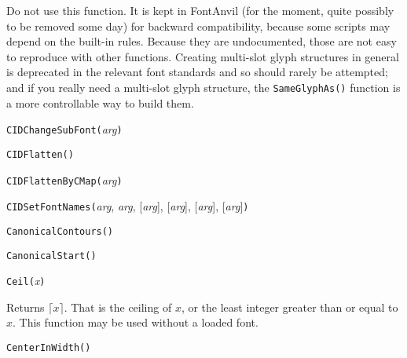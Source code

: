 Do not use this function.  It is kept in FontAnvil (for the moment, quite
possibly to be removed some day) for backward compatibility, because some
scripts may depend on the built-in rules.  Because they are undocumented,
those are not easy to reproduce with other functions.  Creating multi-slot
glyph structures in general is deprecated in the relevant font standards and
so should rarely be attempted; and if you really need a multi-slot glyph
structure, the \texttt{SameGlyphAs()} function is a more controllable way to
build them.



\texttt{CIDChangeSubFont(}\textit{arg}\texttt{)}



\texttt{CIDFlatten(}\texttt{)}



\texttt{CIDFlattenByCMap(}\textit{arg}\texttt{)}



\texttt{CIDSetFontNames(}\textit{arg}, \textit{arg}, [\textit{arg}], [\textit{arg}], [\textit{arg}], [\textit{arg}]\texttt{)}



\texttt{CanonicalContours(}\texttt{)}



\texttt{CanonicalStart(}\texttt{)}



\texttt{Ceil(}\textit{x}\texttt{)}

Returns $\lceil x \rceil$.  That is the ceiling of $x$, or the least
integer greater than or equal to $x$.  This function may be used without a
loaded font.



\texttt{CenterInWidth(}\texttt{)}


